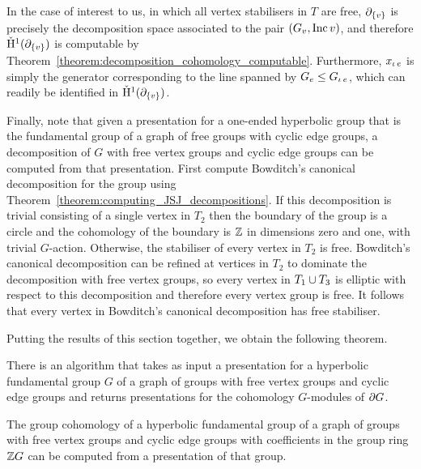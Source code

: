 In the case of interest to us, in which all vertex stabilisers in $T$ are free, $\partial_{\{v\}}$ is precisely the decomposition space associated to the pair $(G_v, \operatorname{\mathrm{Inc}} v)$, and therefore $\check{\mathrm{H}}{}^1(\partial_{\{v\}})$ is computable by Theorem~\ref{theorem:decomposition_cohomology_computable}.
Furthermore, $x_{\operatorname{\iota} e}$ is simply the generator corresponding to the line spanned by $G_e \leq G_{\operatorname{\iota} e}$, which can readily be identified in $\check{\mathrm{H}}{}^1(\partial_{\{v\}})$.

Finally, note that given a presentation for a one-ended hyperbolic group that is the fundamental group of a graph of free groups with cyclic edge groups, a decomposition of $G$ with free vertex groups and cyclic edge groups can be computed from that presentation.
First compute Bowditch's canonical decomposition for the group using Theorem~\ref{theorem:computing_JSJ_decompositions}.
If this decomposition is trivial consisting of a single vertex in $T_2$ then the boundary of the group is a circle and the \vCech{} cohomology of the boundary is $\mathbb{Z}$ in dimensions zero and one, with trivial $G$-action.
Otherwise, the stabiliser of every vertex in $T_2$ is free.
Bowditch's canonical decomposition can be refined at vertices in $T_2$ to dominate the decomposition with free vertex groups, so every vertex in $T_1 \cup T_3$ is elliptic with respect to this decomposition and therefore every vertex group is free.
It follows that every vertex in Bowditch's canonical decomposition has free stabiliser.

Putting the results of this section together, we obtain the following theorem.

\begin{theorem}
  There is an algorithm that takes as input a presentation for a hyperbolic fundamental group $G$ of a graph of groups with free vertex groups and cyclic edge groups and returns presentations for the \vCech{} cohomology $G$-modules of\/ $\partial G$.
\end{theorem}

\begin{corollary}
  The group cohomology of a hyperbolic fundamental group of a graph of groups with free vertex groups and cyclic edge groups with coefficients in the group ring $\mathbb{Z} G$ can be computed from a presentation of that group.
\end{corollary}

